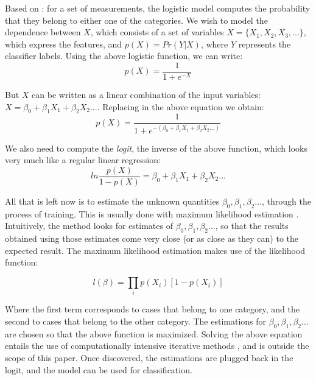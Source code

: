 Based on \cite{kleinbaum2010logistic,logmodel,statistics}: for a set of measurements, the logistic model computes the probability that they belong to either one of the categories. We wish to model the dependence between $X$, which consists of a set of variables $X = \lbrace X_1,X_2,X_3,... \rbrace $, which express the features, and $p(X) = Pr(Y \vert X)$, where $Y$ represents the classifier labels. Using the above logistic function, we can write:
\begin{equation*}
p(X) = \frac{1}{1+e^{-X}}
\end{equation*}

But $X$ can be written as a linear combination of the input variables: $X = \beta_0 + \beta_1X_1 + \beta_2X_2 ... $. Replacing in the above equation we obtain:
\begin{equation*}
p(X) = \frac{1}{1+e^{-(\beta_0 + \beta_1X_1 + \beta_2X_2 ...)}}
\end{equation*}

We also need to compute the \textit{logit}, the inverse of the above function, which looks very much like a regular linear regression:
\begin{equation*}
ln\frac{p(X)}{1 - p(X)} = \beta_0 + \beta_1X_1 + \beta_2X_2 ...
\end{equation*}

All that is left now is to estimate the unknown quantities $\beta_0, \beta_1, \beta_2...$, through the process of training. This is usually done with maximum likelihood estimation \cite{menard2009logistic}. Intuitively, the method looks for estimates of $\beta_0, \beta_1, \beta_2...$, so that the results obtained using those estimates come very close (or as close as they can) to the expected result. The maximum likelihood estimation makes use of the likelihood function:

\begin{equation*}
l(\beta) = \prod_ip(X_i)[1 - p(X_i)]
\end{equation*}
 
Where the first term corresponds to cases that belong to one category, and the second to cases that belong to the other category. The estimations for $\beta_0, \beta_1, \beta_2...$ are chosen so that the above function is maximized. Solving the above equation entails the use of computationally intensive iterative methods \cite{logmodel}, and is outside the scope of this paper. Once discovered, the estimations are plugged back in the logit, and the model can be used for classification.
 
